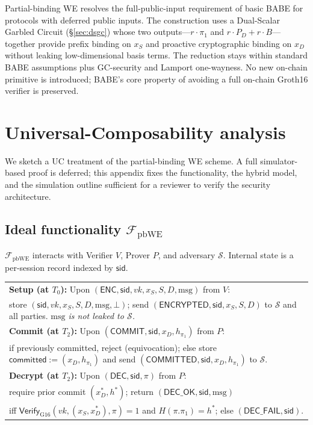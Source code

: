 \documentclass[11pt]{article}
\newcommand{\msg}{\mathrm{msg}}
\begin{document}
Partial-binding WE resolves the full-public-input requirement of
basic BABE for protocols with deferred public inputs. The
construction uses a Dual-Scalar Garbled Circuit (\S\ref{sec:dsgc})
whose two outputs---$r \cdot \pi_1$ and
$r \cdot P_D + r \cdot B$---together
provide prefix binding on $x_S$ and proactive cryptographic binding
on $x_D$ without leaking low-dimensional basis terms. The reduction
stays within standard BABE assumptions plus GC-security and Lamport
one-wayness. No new on-chain primitive is introduced; BABE's core
property of avoiding a full on-chain Groth16 verifier is preserved.

\appendix
\section{Universal-Composability analysis}\label{app:uc}

We sketch a UC treatment of the partial-binding WE scheme. A full
simulator-based proof is deferred; this appendix fixes the
functionality, the hybrid model, and the simulation outline
sufficient for a reviewer to verify the security architecture.

\subsection{Ideal functionality $\mathcal{F}_{\mathrm{pbWE}}$}

$\mathcal{F}_{\mathrm{pbWE}}$ interacts with Verifier $V$,
Prover $P$, and adversary $\mathcal{S}$. Internal state is a
per-session record indexed by $\mathsf{sid}$.

\begin{center}
\begin{tabular}{@{}p{15cm}@{}}
\toprule
\textbf{Setup (at $T_0$):} Upon $(\mathsf{ENC}, \mathsf{sid}, vk, x_S, S, D, \msg)$ from $V$: \\
\quad store $(\mathsf{sid}, vk, x_S, S, D, \msg, \bot)$; send
$(\mathsf{ENCRYPTED}, \mathsf{sid}, x_S, S, D)$ to $\mathcal{S}$ and
all parties. \emph{$\msg$ is not leaked to $\mathcal{S}$.} \\
\midrule
\textbf{Commit (at $T_2$):} Upon $(\mathsf{COMMIT}, \mathsf{sid}, x_D, h_{\pi_1})$ from $P$: \\
\quad if previously committed, reject (equivocation); else store
$\mathsf{committed} := (x_D, h_{\pi_1})$ and send
$(\mathsf{COMMITTED}, \mathsf{sid}, x_D, h_{\pi_1})$ to $\mathcal{S}$. \\
\midrule
\textbf{Decrypt (at $T_2$):} Upon $(\mathsf{DEC}, \mathsf{sid}, \pi)$ from $P$: \\
\quad require prior commit $(x_D^*, h^*)$; return $(\mathsf{DEC\_OK}, \mathsf{sid}, \msg)$ \\
\quad iff $\mathsf{Verify}_{\mathrm{G16}}(vk, (x_S, x_D^*), \pi) = 1$
and $H(\pi.\pi_1) = h^*$; else $(\mathsf{DEC\_FAIL}, \mathsf{sid})$. \\
\bottomrule
\end{tabular}
\end{center}
\end{document}
